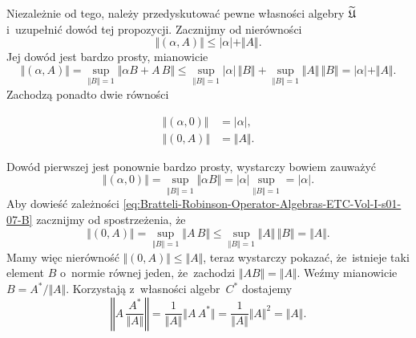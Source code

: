 \documentclass[a4paper,11pt]{article}
\numberwithin{equation}{section}
\begin{document}
Niezależnie od tego, należy przedyskutować pewne własności algebry
$\widetilde{\mathfrak{U}}$ i~uzupełnić dowód tej propozycji. Zacznijmy od nierówności
\begin{equation}
  \label{eq:Bratteli-Robinson-Operator-Algebras-ETC-Vol-I-s01-05}
  \Vert ( \alpha, A ) \Vert \leq | \alpha | + \Vert A \Vert.
\end{equation}
Jej dowód jest bardzo prosty, mianowicie
\begin{equation}
  \label{eq:Bratteli-Robinson-Operator-Algebras-ETC-Vol-I-s01-06}
  \Vert ( \alpha, A ) \Vert =
  \sup_{ \Vert B \Vert = 1 } \Vert \alpha B + A \, B \Vert \leq
  \sup_{ \Vert B \Vert = 1 } | \alpha | \, \Vert B \Vert +
  \sup_{ \Vert B \Vert = 1 } \Vert A \Vert \, \Vert B \Vert =
  | \alpha | + \Vert A \Vert.
\end{equation}
Zachodzą ponadto dwie równości

\negVerSpaceFour


\begin{subequations}

  \begin{align}
    \label{eq:Bratteli-Robinson-Operator-Algebras-ETC-Vol-I-s01-07-A}
    \Vert ( \alpha, 0 ) \Vert &= | \alpha |, \\
    \label{eq:Bratteli-Robinson-Operator-Algebras-ETC-Vol-I-s01-07-B}
    \Vert ( 0, A ) \Vert &= \Vert A \Vert.
  \end{align}

\end{subequations}

\noindent
Dowód pierwszej jest ponownie bardzo prosty, wystarczy bowiem zauważyć
\begin{equation}
  \label{eq:Bratteli-Robinson-Operator-Algebras-ETC-Vol-I-s01-08}
  \Vert ( \alpha, 0 ) \Vert =
  \sup_{ \Vert B \Vert = 1 } \Vert \alpha B \Vert =
  | \alpha | \sup_{ \Vert B \Vert = 1 } = | \alpha |.
\end{equation}
Aby dowieść zależności
\eqref{eq:Bratteli-Robinson-Operator-Algebras-ETC-Vol-I-s01-07-B} zacznijmy
od spostrzeżenia, że
\begin{equation}
  \label{eq:Bratteli-Robinson-Operator-Algebras-ETC-Vol-I-s01-09}
  \Vert ( 0, A ) \Vert =
  \sup_{ \Vert B \Vert = 1 } \Vert A \, B \Vert \leq
  \sup_{ \Vert B \Vert = 1 } \Vert A \Vert \, \Vert B \Vert = \Vert A \Vert.
\end{equation}
Mamy więc nierówność $\Vert ( 0, A ) \Vert \leq \Vert A \Vert$, teraz wystarczy pokazać,
że~istnieje taki element $B$ o~normie równej jeden, że~zachodzi
$\Vert A B \Vert = \Vert A \Vert$. Weźmy mianowicie $B = A^{ * } / \Vert A \Vert$. Korzystają
z~własności algebr~$C^{ * }$ dostajemy
\begin{equation}
  \label{eq:Bratteli-Robinson-Operator-Algebras-ETC-Vol-I-s01-10}
  \left\Vert A \, \frac{ A^{ * } }{ \Vert A \Vert } \right\Vert =
  \frac{ 1 }{ \Vert A \Vert } \Vert A \, A^{ * } \Vert =
  \frac{ 1 }{ \Vert A \Vert } \Vert A \Vert^{ 2 } = \Vert A \Vert.
\end{equation}
\end{document}
